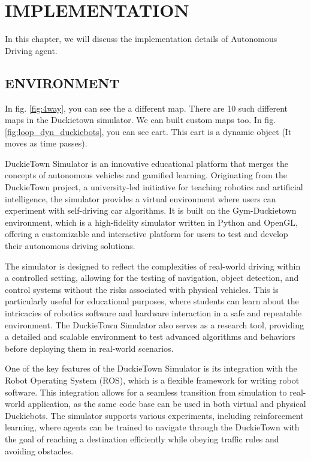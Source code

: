 
\chapter{\uppercase{IMPLEMENTATION}} %
\label{chap4} %

\begin{spacing}{1.5} 
\begin{sloppypar}

In this chapter, we will discuss the implementation details of Autonomous Driving agent.
\section{ENVIRONMENT}

In fig. \ref{fig:4way}, you can see the a different map. There are 10 such different maps in the Duckietown simulator. We can built custom maps too. In fig. \ref{fig:loop_dyn_duckiebots}, you can see cart. This cart is a dynamic object (It moves as time passes).

DuckieTown Simulator is an innovative educational platform that merges the concepts of autonomous vehicles and gamified learning. Originating from the DuckieTown project, a university-led initiative for teaching robotics and artificial intelligence, the simulator provides a virtual environment where users can experiment with self-driving car algorithms. It is built on the Gym-Duckietown environment, which is a high-fidelity simulator written in Python and OpenGL, offering a customizable and interactive platform for users to test and develop their autonomous driving solutions.

The simulator is designed to reflect the complexities of real-world driving within a controlled setting, allowing for the testing of navigation, object detection, and control systems without the risks associated with physical vehicles. This is particularly useful for educational purposes, where students can learn about the intricacies of robotics software and hardware interaction in a safe and repeatable environment. The DuckieTown Simulator also serves as a research tool, providing a detailed and scalable environment to test advanced algorithms and behaviors before deploying them in real-world scenarios.

One of the key features of the DuckieTown Simulator is its integration with the Robot Operating System (ROS), which is a flexible framework for writing robot software. This integration allows for a seamless transition from simulation to real-world application, as the same code base can be used in both virtual and physical Duckiebots. The simulator supports various experiments, including reinforcement learning, where agents can be trained to navigate through the DuckieTown with the goal of reaching a destination efficiently while obeying traffic rules and avoiding obstacles.


\end{sloppypar}
\end{spacing}
